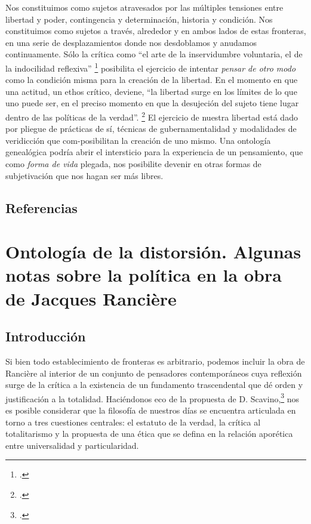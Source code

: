Nos constituimos como sujetos atravesados por las múltiples tensiones entre libertad y poder, contingencia y determinación, historia y condición. Nos constituimos como sujetos a través, alrededor y en ambos lados de estas fronteras, en una serie de desplazamientos donde nos desdoblamos y anudamos continuamente. Sólo la crítica como \enquote{el arte de la inservidumbre voluntaria, el de la indocilidad reflexiva} \footcite[][7]{@7042-FOUCAULT1995}
posibilita el ejercicio de intentar \emph{pensar de otro modo} como la condición misma para la creación de la libertad. En el momento en que una actitud, un ethos crítico, deviene, \enquote{la libertad surge en los límites de lo que uno puede ser, en el preciso momento en que la desujeción del sujeto tiene lugar dentro de las políticas de la verdad}. \footcite[][8]{@7036-BUTLER2001} El ejercicio de nuestra libertad está dado por pliegue de prácticas de sí, técnicas de gubernamentalidad y modalidades de veridicción que com-posibilitan la creación de uno mismo. Una ontología genealógica podría abrir el intersticio para la experiencia de un pensamiento, que como \emph{forma de vida} plegada, nos posibilite devenir en otras formas de subjetivación que nos hagan ser más libres.

\section*{Referencias}
\printbibliography[heading=none]   %

\chapter[Ontología de la distorsión...]{Ontología de la distorsión. Algunas notas sobre la política en la obra de Jacques Rancière}


\section{Introducción}

Si bien todo establecimiento de fronteras es arbitrario, podemos incluir la obra de Rancière al interior de un conjunto de pensadores contemporáneos cuya reflexión surge de la crítica a la existencia de un fundamento trascendental que dé orden y justificación a la totalidad. Haciéndonos eco de la propuesta de D. Scavino,\footcite[][]{@7062-SCAVINO2010} nos es posible considerar que la filosofía de nuestros días se encuentra articulada en torno a tres cuestiones centrales: el estatuto de la verdad, la crítica al totalitarismo y la propuesta de una ética que se defina en la relación aporética entre universalidad y particularidad.

